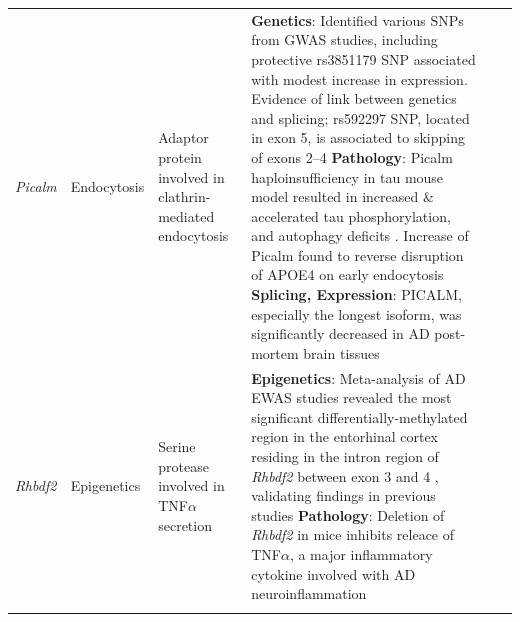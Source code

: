 \begin{changemargin}{1.5cm}
\begin{landscape}
\begin{longtable}[c]{p{1cm}p{2cm}p{4cm}p{16cm}p{1cm}p{1cm}}
			\centering \textit{Picalm} &
			\centering Endocytosis  &
			\centering Adaptor protein involved in clathrin-mediated endocytosis &	
			\tabitem \textbf{Genetics}: Identified various SNPs from GWAS studies, including protective rs3851179 SNP associated with modest increase in expression. Evidence of link between genetics and splicing; rs592297 SNP, located in exon 5, is associated to skipping of exons 2–4\cite{Parikh2014} \newline
			\tabitem \textbf{Pathology}: Picalm haploinsufficiency in tau mouse model resulted in increased \& accelerated tau phosphorylation, and autophagy deficits \cite{Ando2020}. Increase of Picalm found to reverse disruption of APOE4 on early endocytosis  \cite{Narayan2020} \newline
			\tabitem \textbf{Splicing, Expression}: PICALM, especially the longest isoform, was significantly decreased in AD post-mortem brain tissues \cite{Ando2016} \\
			\hdashline[0.5pt/5pt]					
			
			\centering \textit{Rhbdf2} &
			\centering Epigenetics  &
			\centering Serine protease involved in TNF$\alpha$ secretion &
			\tabitem \textbf{Epigenetics}: Meta-analysis of AD EWAS studies revealed the most significant differentially-methylated region in the entorhinal cortex residing in the intron region of \textit{Rhbdf2} between exon 3 and 4 \cite{Smith2021}, validating findings in previous studies\cite{DeJager2014, Lardenoije2019}\newline
			\tabitem \textbf{Pathology}: Deletion of \textit{Rhbdf2} in mice inhibits releace of TNF$\alpha$, a major inflammatory cytokine involved with AD neuroinflammation\cite{Levy2020}\\
			\hdashline[0.5pt/5pt]	
			

\end{longtable}
\end{landscape}
\end{changemargin}
